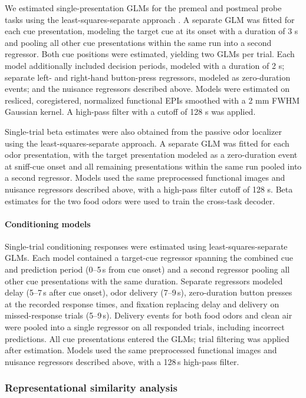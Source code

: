 \documentclass[12pt,letterpaper]{article}
\begin{document}
We estimated single-presentation GLMs for the premeal and postmeal probe tasks using the least-squares-separate approach \citep{mumford2012deconvolving}. A separate GLM was fitted for each cue presentation, modeling the target cue at its onset with a duration of 3 s and pooling all other cue presentations within the same run into a second regressor. Both cue positions were estimated, yielding two GLMs per trial. Each model additionally included decision periods, modeled with a duration of 2 s; separate left- and right-hand button-press regressors, modeled as zero-duration events; and the nuisance regressors described above. Models were estimated on resliced, coregistered, normalized functional EPIs smoothed with a 2 mm FWHM Gaussian kernel. A high-pass filter with a cutoff of 128 s was applied.

Single-trial beta estimates were also obtained from the passive odor localizer using the least-squares-separate approach. A separate GLM was fitted for each odor presentation, with the target presentation modeled as a zero-duration event at sniff-cue onset and all remaining presentations within the same run pooled into a second regressor. Models used the same preprocessed functional images and nuisance regressors described above, with a high-pass filter cutoff of 128 s. Beta estimates for the two food odors were used to train the cross-task decoder.

\paragraph*{Conditioning models}

Single-trial conditioning responses were estimated using least-squares-separate GLMs. Each model contained a target-cue regressor spanning the combined cue and prediction period (0--5\,s from cue onset) and a second regressor pooling all other cue presentations with the same duration. Separate regressors modeled delay (5--7\,s after cue onset), odor delivery (7--9\,s), zero-duration button presses at the recorded response times, and fixation replacing delay and delivery on missed-response trials (5--9\,s). Delivery events for both food odors and clean air were pooled into a single regressor on all responded trials, including incorrect predictions. All cue presentations entered the GLMs; trial filtering was applied after estimation. Models used the same preprocessed functional images and nuisance regressors described above, with a 128\,s high-pass filter.

\subsubsection*{Representational similarity analysis}
\end{document}
